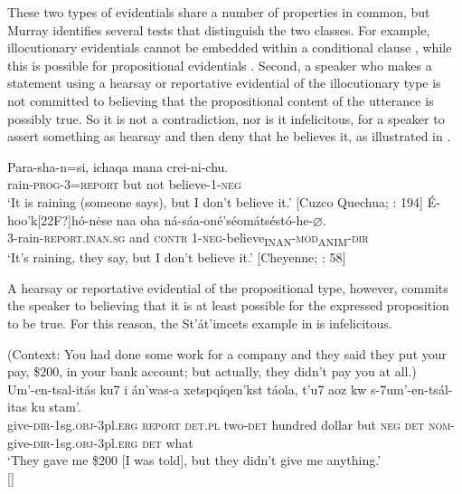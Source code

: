 These two types of evidentials share a number of properties in common, but Murray identifies several tests that distinguish the two classes. For example, illocutionary evidentials cannot be embedded within a conditional clause , while this is possible for propositional evidentials . Second, a speaker who makes a statement using a hearsay or reportative evidential of the illocutionary type is not committed to believing that the propositional content of the utterance is possibly true. So it is not a contradiction, nor is it infelicitous, for a speaker to assert something as hearsay and then deny that he believes it, as illustrated in .


\ea
\ea \gll Para-sha-n=si,  ichaqa  mana  crei-ni-chu.\\
rain-\textsc{prog}-3=\textsc{report}  but  not  believe-1-\textsc{neg}\\
\glt ‘It is raining (someone says), but I don’t believe it.’ [Cuzco Quechua; \citealt{Faller2002}: 194]
\ex \gll  É-hoo'k[22F?]hó-n\.ese  naa  oha  ná-sáa-oné'séomátséstó-he-⌀.\\
3-rain-\textsc{report}.\textsc{inan.sg}  and  \textsc{contr}  1-\textsc{neg}-believe\textsubscript{INAN}-\textsc{mod\textsubscript{A}}\textsubscript{NIM}-\textsc{dir}\\
\glt ‘It’s raining, they say, but I don’t believe it.’  [Cheyenne; \citealt{Murray2010}: 58]
\z \z


A hearsay or reportative evidential of the propositional type, however, commits the speaker to believing that it is at least possible for the expressed proposition to be true. For this reason, the St’át’imcets example in  is infelicitous.


\ea
(Context: You had done some work for a company and they said they put your pay, \$200, in your bank account; but actually, they didn’t pay you at all.)\\
\gll *Um’-en-tsal-itás  ku7  i  án’was-a  xetspqíqen’kst  táola, t’u7  aoz  kw  s-7um’-en-tsál-itas  ku  stam’.\\
 give-\textsc{dir}-1sg.\textsc{obj}-3pl.\textsc{erg}  \textsc{report}  \textsc{det.pl}  two-\textsc{det}  hundred  dollar but  \textsc{neg}  \textsc{det}  \textsc{nom}-give-\textsc{dir}-1sg.\textsc{obj}-3pl.\textsc{erg}  \textsc{det}  what\\
\glt ‘They gave me \$200 [I was told], but they didn’t give me anything.’\\
   {}[\citealt{MatthewsonEtAl2007}]
\z


